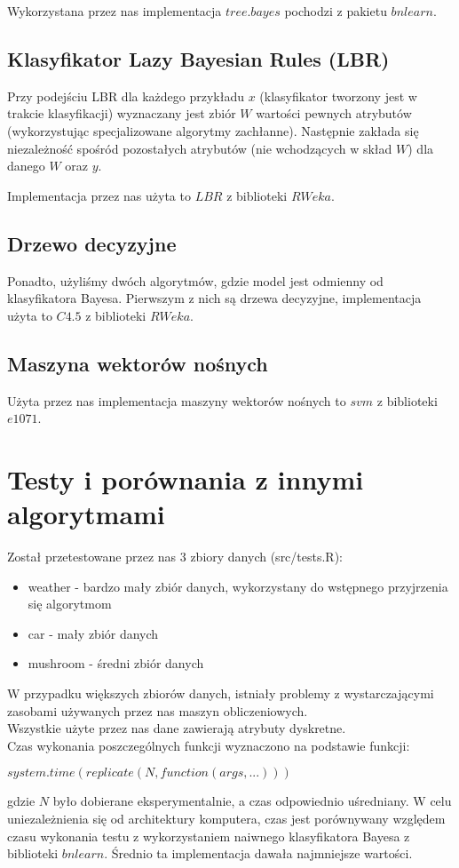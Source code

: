 \documentclass[16]{article}
\begin{document}
Wykorzystana przez nas implementacja $tree.bayes$ pochodzi z pakietu $bnlearn$.
 
\subsection{Klasyfikator Lazy Bayesian Rules (LBR)}
Przy podejściu LBR dla każdego przykładu $x$ (klasyfikator tworzony jest w trakcie klasyfikacji) wyznaczany jest zbiór $W$ wartości pewnych atrybutów (wykorzystując specjalizowane algorytmy zachłanne). Następnie zakłada się niezależność spośród pozostałych atrybutów (nie wchodzących w skład $W$) dla danego $W$ oraz $y$. 
 
Implementacja przez nas użyta to $LBR$ z biblioteki $RWeka$. 
 
\subsection{Drzewo decyzyjne}
Ponadto, użyliśmy dwóch algorytmów, gdzie model jest odmienny od klasyfikatora Bayesa. Pierwszym z nich są drzewa decyzyjne, implementacja użyta to $C4.5$ z biblioteki $RWeka$.

\subsection{Maszyna wektorów nośnych}
Użyta przez nas implementacja maszyny wektorów nośnych to $svm$ z biblioteki $e1071$.

\section{Testy i porównania z innymi algorytmami}
Został przetestowane przez nas 3 zbiory danych (src/tests.R): 
\begin{itemize}
\item weather - bardzo mały zbiór danych, wykorzystany do wstępnego przyjrzenia się algorytmom 
\item car - mały zbiór danych
\item mushroom - średni zbiór danych
\end{itemize}
W przypadku większych zbiorów danych, istniały problemy z wystarczającymi zasobami używanych przez nas maszyn obliczeniowych. \\

Wszystkie użyte przez nas dane zawierają atrybuty dyskretne. \\

Czas wykonania poszczególnych funkcji wyznaczono na podstawie funkcji:
\begin{center}
$system.time(replicate(N, function(args, ...)))$
\end{center}
 gdzie $N$ było dobierane eksperymentalnie, a czas odpowiednio uśredniany. W celu uniezależnienia się od architektury komputera, czas jest porównywany względem czasu wykonania testu z wykorzystaniem naiwnego klasyfikatora Bayesa z biblioteki $bnlearn$. Średnio ta implementacja dawała najmniejsze wartości.
\end{document}
